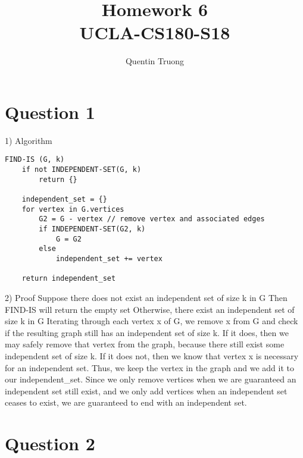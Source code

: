 \documentclass[11pt, oneside]{article}
\title{Homework 6\\UCLA-CS180-S18}
\author{Quentin Truong}
\begin{document}
\maketitle
{}


\section{Question 1}

1)  Algorithm \newline
\begin{lstlisting}
FIND-IS (G, k)
    if not INDEPENDENT-SET(G, k)
        return {}

    independent_set = {}
    for vertex in G.vertices
        G2 = G - vertex // remove vertex and associated edges
        if INDEPENDENT-SET(G2, k)
            G = G2
        else
            independent_set += vertex

    return independent_set
\end{lstlisting}
2)  Proof \newline
    Suppose there does not exist an independent set of size k in G \newline
    Then FIND-IS will return the empty set \newline
    Otherwise, there exist an independent set of size k in G \newline
    Iterating through each vertex x of G, we remove x from G and check if the resulting graph still has an independent set of size k. If it does, then we may safely remove that vertex from the graph, because there still exist some independent set of size k. If it does not, then we know that vertex x is necessary for an independent set. Thus, we keep the vertex in the graph and we add it to our independent\_set. Since we only remove vertices when we are guaranteed an independent set still exist, and we only add vertices when an independent set ceases to exist, we are guaranteed to end  with an independent set. \newline
\clearpage

\section{Question 2}
\end{document}
